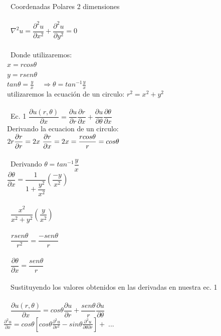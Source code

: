 \documentclass[10pt,a4paper]{report}
\begin{document}
\\
\\\
\ Coordenadas Polares 2 dimensiones
\\
\\\
\ $\nabla^{2}u= \dfrac{\partial^2 u}{\partial x^{2}} + \dfrac{\partial ^{2}u}{\partial y^{2}}=0$
\\
\\\
\ Donde utilizaremos:
\\
\ $x = r cos \theta $
\\
\ $y = r sen \theta $
\\
\ $tan \theta = \frac{y}{x} \;\;\;\;\Rightarrow \theta = tan^{-1} \frac{y}{x}$
\\
\ utilizaremos la ecuación de un circulo: $ r^{2} = x^{2} + y^{2}$
\\
\\\
\ Ec. 1 $\dfrac{\partial u (r, \theta )}{\partial x} = \dfrac{\partial u }{\partial r} \dfrac{\partial r}{\partial x} + \dfrac{\partial u}{\partial \theta} \dfrac{\partial \theta}{\partial x}$
\\
\ Derivando la ecuacion de un circulo: 
\\
\ $\displaystyle 2r \frac{\partial r}{\partial r} = 2x
\\
\ \displaystyle \frac{\partial r}{\partial x} = 2x = \frac{r cos \theta}{r} = cos \theta$
\\
\\\
\ Derivando $\theta = tan^{-1} \dfrac{y}{x}$
\\
\ $\dfrac{\partial \theta}{\partial x} = \dfrac{1}{1 + \dfrac{y^{2}}{x^{2}}} \left( \dfrac{-y}{x^{2}} \right)$
\\
\\\
\ $\dfrac{x^{2}}{x^{2}+y^{2}}  \left( \dfrac{y}{x^{2}} \right)$
\\
\\\
\ $\dfrac{r sen \theta}{r^{2}}= \dfrac{-sen \theta}{r}$ 
\\
\\\
\ $\dfrac{\partial \theta}{\partial x}= \dfrac{sen \theta}{r}$
\\
\\\
\ Sustituyendo los valores obtenidos en las derivadas en nuestra ec. 1
\\
\\\
\ $\dfrac{\partial u (r, \theta )}{\partial x} = cos \theta \dfrac{\partial u }{\partial r} + \dfrac{sen \theta}{r} \dfrac{\partial u}{\partial \theta}$ 
\ \\ $\displaystyle \frac{\partial ^2 u}{\partial x} = cos \theta \left[cos \theta \frac{\partial ^2 u}{\partial r^2} - sin \theta \frac{\partial ^2 u}{\partial \theta \partial r}\right] + \; ... $
\end{document}
